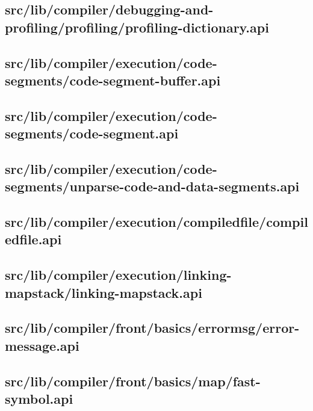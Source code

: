 \subsection{src/lib/compiler/debugging-and-profiling/profiling/profiling-dictionary.api}


\subsection{src/lib/compiler/execution/code-segments/code-segment-buffer.api}


\subsection{src/lib/compiler/execution/code-segments/code-segment.api}


\subsection{src/lib/compiler/execution/code-segments/unparse-code-and-data-segments.api}


\subsection{src/lib/compiler/execution/compiledfile/compiledfile.api}


\subsection{src/lib/compiler/execution/linking-mapstack/linking-mapstack.api}


\subsection{src/lib/compiler/front/basics/errormsg/error-message.api}


\subsection{src/lib/compiler/front/basics/map/fast-symbol.api}


